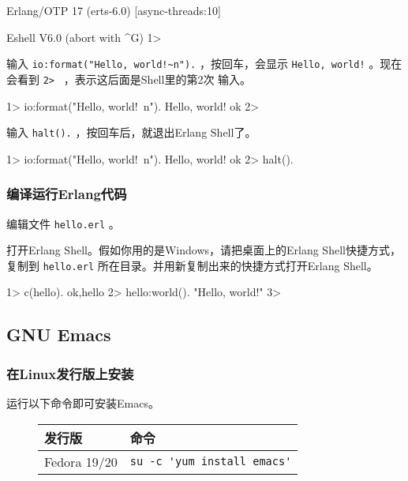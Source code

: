 \documentclass[preview,multi,crop=false,border=1in,class=memoir]{standalone}
\begin{document}
\begin{preview-page}
\begin{Listing}
Erlang/OTP 17 (erts-6.0) [async-threads:10]

Eshell V6.0  (abort with ^G)
1>
\end{Listing}

输入 \verb|io:format("Hello, world!~n").| ，按回车，会显示
\verb|Hello, world!| 。现在会看到 \verb|2> | ，表示这后面是Shell里的第2次
输入。

\begin{ErlangShellSession}
1> io:format("Hello, world!~n").
Hello, world!
ok
2>
\end{ErlangShellSession}

输入 \verb|halt().| ，按回车后，就退出Erlang Shell了。

\begin{Listing}
1> io:format("Hello, world!~n").
Hello, world!
ok
2> halt().
\end{Listing}

\subsubsection{编译运行Erlang代码}

编辑文件 \verb|hello.erl| 。


打开Erlang Shell。假如你用的是Windows，请把桌面上的Erlang Shell快捷方式，
复制到 \verb|hello.erl| 所在目录。并用新复制出来的快捷方式打开Erlang
Shell。

\begin{ErlangShellSession}
1> c(hello).
{ok,hello}
2> hello:world().
"Hello, world!"
3>
\end{ErlangShellSession}

\subsection{GNU Emacs}

\subsubsection{在Linux发行版上安装}

运行以下命令即可安装Emacs。

\begin{figure}[hbt]
\centering
\begin{tabular}{|l|l|}
\hline
发行版 & 命令 \\
\hline
Fedora 19/20 & \verb|su -c 'yum install emacs'| \\
\hline
\end{tabular}
\end{figure}


\end{preview-page}
\end{document}
